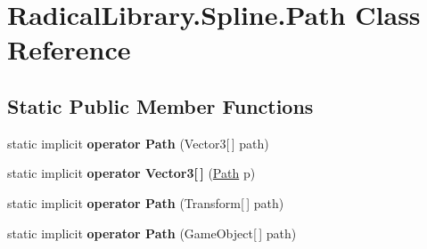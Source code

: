\hypertarget{class_radical_library_1_1_spline_1_1_path}{}\section{Radical\+Library.\+Spline.\+Path Class Reference}
\label{class_radical_library_1_1_spline_1_1_path}
\subsection*{Static Public Member Functions}
\begin{DoxyCompactItemize}
\item 
\mbox{\label{class_radical_library_1_1_spline_1_1_path_a3cb523b249610fcb64f4a3387b881304}} 
static implicit {\bfseries operator Path} (Vector3\mbox{[}$\,$\mbox{]} path)
\item 
\mbox{\label{class_radical_library_1_1_spline_1_1_path_aee769e4853c6917039d1fd15035a4538}} 
static implicit {\bfseries operator Vector3\mbox{[}$\,$\mbox{]}} (\hyperlink{class_radical_library_1_1_spline_1_1_path}{Path} p)
\item 
\mbox{\label{class_radical_library_1_1_spline_1_1_path_afd16f8d283f669e98a918e49b6a57b06}} 
static implicit {\bfseries operator Path} (Transform\mbox{[}$\,$\mbox{]} path)
\item 
\mbox{\label{class_radical_library_1_1_spline_1_1_path_a426968ba542f38021b57a469d6980d34}} 
static implicit {\bfseries operator Path} (Game\+Object\mbox{[}$\,$\mbox{]} path)
\end{DoxyCompactItemize}

